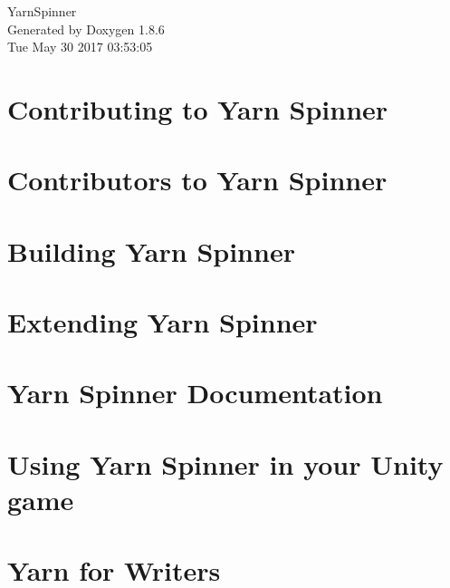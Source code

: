 \documentclass[twoside]{book}
\newcommand{\clearemptydoublepage}{%
  \newpage{\pagestyle{empty}\cleardoublepage}%
}
\begin{document}
\hypersetup{pageanchor=false}
\begin{titlepage}
\vspace*{7cm}
\begin{center}%
{\Large Yarn\-Spinner }\\
\vspace*{1cm}
{\large Generated by Doxygen 1.8.6}\\
\vspace*{0.5cm}
{\small Tue May 30 2017 03:53:05}\\
\end{center}
\end{titlepage}
\clearemptydoublepage
\tableofcontents
\clearemptydoublepage
{}
\hypersetup{pageanchor=true}

\chapter{Contributing to Yarn Spinner}
\label{d7/d46/a00002}
\hypertarget{d7/d46/a00002}{}

\chapter{Contributors to Yarn Spinner}
\label{d0/d0b/a00004}
\hypertarget{d0/d0b/a00004}{}

\chapter{Building Yarn Spinner}
\label{de/d21/a00006}
\hypertarget{de/d21/a00006}{}

\chapter{Extending Yarn Spinner}
\label{d4/dee/a00008}
\hypertarget{d4/dee/a00008}{}

\chapter{Yarn Spinner Documentation}
\label{d7/dec/a00010}
\hypertarget{d7/dec/a00010}{}

\chapter{Using Yarn Spinner in your Unity game}
\label{df/d86/a00012}
\hypertarget{df/d86/a00012}{}

\chapter{Yarn for Writers}
\label{d2/de7/a00014}
\hypertarget{d2/de7/a00014}{}

\end{document}
